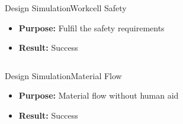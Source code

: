 \begin{frame}{Design Simulation}{Workcell Safety}
\begin{itemize}
        \item \textbf{Purpose:}  Fulfil the safety requirements
        \item \textbf{Result:} Success
\end{itemize}
\begin{columns}
\end{columns}
\end{frame}

\begin{frame}{Design Simulation}{Material Flow}
\begin{itemize}
    \item \textbf{Purpose:} Material flow without human aid
    \item \textbf{Result:} Success
\end{itemize}        
\end{frame}

